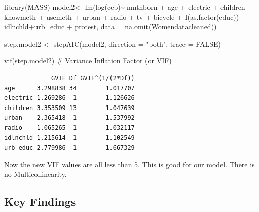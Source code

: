 \documentclass[
  letterpaper,
  DIV=11,
  numbers=noendperiod]{scrartcl}
\newenvironment{Shaded}{\begin{snugshade}}{\end{snugshade}}
\newcommand{\AttributeTok}[1]{\textcolor[rgb]{0.40,0.45,0.13}{#1}}
\newcommand{\CommentTok}[1]{\textcolor[rgb]{0.37,0.37,0.37}{#1}}
\newcommand{\ConstantTok}[1]{\textcolor[rgb]{0.56,0.35,0.01}{#1}}
\newcommand{\FunctionTok}[1]{\textcolor[rgb]{0.28,0.35,0.67}{#1}}
\newcommand{\NormalTok}[1]{\textcolor[rgb]{0.00,0.23,0.31}{#1}}
\newcommand{\OtherTok}[1]{\textcolor[rgb]{0.00,0.23,0.31}{#1}}
\newcommand{\SpecialCharTok}[1]{\textcolor[rgb]{0.37,0.37,0.37}{#1}}
\newcommand{\StringTok}[1]{\textcolor[rgb]{0.13,0.47,0.30}{#1}}
\begin{document}
\begin{Shaded}
\begin{Highlighting}[]
\FunctionTok{library}\NormalTok{(MASS)}
\NormalTok{model2}\OtherTok{\textless{}{-}} \FunctionTok{lm}\NormalTok{(}\FunctionTok{log}\NormalTok{(ceb)}\SpecialCharTok{\textasciitilde{}}\NormalTok{ mnthborn }\SpecialCharTok{+}\NormalTok{ age }\SpecialCharTok{+}
\NormalTok{                            electric }\SpecialCharTok{+}
\NormalTok{                            children }\SpecialCharTok{+}\NormalTok{ knowmeth }\SpecialCharTok{+}
\NormalTok{                            usemeth  }\SpecialCharTok{+}
\NormalTok{                            urban }\SpecialCharTok{+}\NormalTok{ radio }\SpecialCharTok{+}
\NormalTok{                            tv }\SpecialCharTok{+}\NormalTok{ bicycle }\SpecialCharTok{+}
                            \FunctionTok{I}\NormalTok{(}\FunctionTok{as.factor}\NormalTok{(educ)) }\SpecialCharTok{+}
\NormalTok{                            idlnchld}\SpecialCharTok{+}\NormalTok{urb\_educ }\SpecialCharTok{+}
\NormalTok{                            protest, }
                            \AttributeTok{data =} \FunctionTok{na.omit}\NormalTok{(Womendatacleaned))}

\NormalTok{step.model2 }\OtherTok{\textless{}{-}} \FunctionTok{stepAIC}\NormalTok{(model2, }
                        \AttributeTok{direction =} \StringTok{"both"}\NormalTok{, }
                        \AttributeTok{trace =} \ConstantTok{FALSE}\NormalTok{)}

\FunctionTok{vif}\NormalTok{(step.model2) }\CommentTok{\# Variance Inflation Factor (or VIF)}
\end{Highlighting}
\end{Shaded}

\begin{verbatim}
             GVIF Df GVIF^(1/(2*Df))
age      3.298838 34        1.017707
electric 1.269286  1        1.126626
children 3.353509 13        1.047639
urban    2.365418  1        1.537992
radio    1.065265  1        1.032117
idlnchld 1.215614  1        1.102549
urb_educ 2.779986  1        1.667329
\end{verbatim}

Now the new VIF values are all less than 5. This is good for our model.
There is no Multicollinearity.

\hypertarget{key-findings}{%
\subsection{Key Findings}\label{key-findings}}
\end{document}

